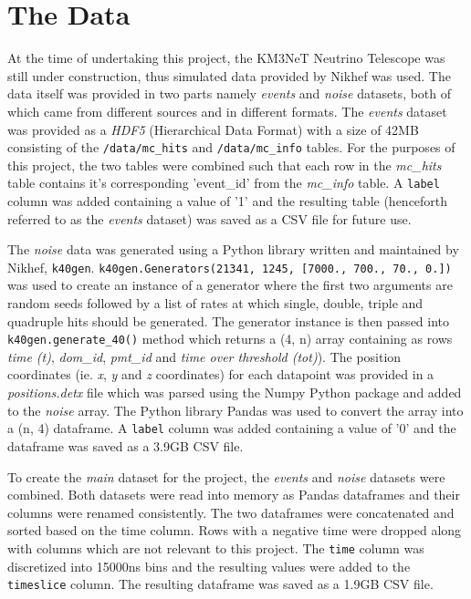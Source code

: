 
\chapter{The Data} %
\label{cha:data}


At the time of undertaking this project, the KM3NeT Neutrino Telescope
was still under construction, thus simulated data provided by Nikhef
was used. The data itself was provided in two parts namely
\emph{events} and \emph{noise} datasets, both of which came from
different sources and in different formats. The \emph{events} dataset
was provided as a \emph{HDF5} (Hierarchical Data Format) with a size
of 42MB consisting of the \texttt{/data/mc\_hits} and
\texttt{/data/mc\_info} tables. For the purposes of this project, the
two tables were combined such that each row in the \textit{mc\_hits}
table contains it's corresponding 'event\_id' from the
\textit{mc\_info} table. A \texttt{label} column was added containing
a value of '1' and the resulting table (henceforth referred to as the
\emph{events} dataset) was saved as a CSV file for future use.

The \emph{noise} data was generated using a Python library written and
maintained by Nikhef, \texttt{k40gen}.
\texttt{k40gen.Generators(21341, 1245, [7000., 700., 70., 0.])} was
used to create an instance of a generator where the first two
arguments are random seeds followed by a list of rates at which
single, double, triple and quadruple hits should be generated. The
generator instance is then passed into \texttt{k40gen.generate\_40()}
method which returns a (4, n) array containing as rows \emph{time
(t)}, \emph{dom\_id}, \emph{pmt\_id} and \emph{time over threshold
(tot)}). The position coordinates (ie. \emph{x}, \emph{y} and \emph{z}
coordinates) for each datapoint was provided in a
\emph{positions.detx} file which was parsed using the Numpy Python
package \cite{numpy} and added to the \emph{noise} array. The Python
library Pandas \cite{pandas} was used to convert the array into a (n,
4) dataframe. A \texttt{label} column was added containing a value of
'0' and the dataframe was saved as a 3.9GB CSV file.

To create the \emph{main} dataset for the project, the \emph{events}
and \emph{noise} datasets were combined. Both datasets were read into
memory as Pandas dataframes and their columns were renamed
consistently. The two dataframes were concatenated and sorted based on
the time column. Rows with a negative time were dropped along with
columns which are not relevant to this project. The \texttt{time}
column was discretized into 15000ns bins and the resulting values were
added to the \texttt{timeslice} column. The resulting dataframe was
saved as a 1.9GB CSV file.

